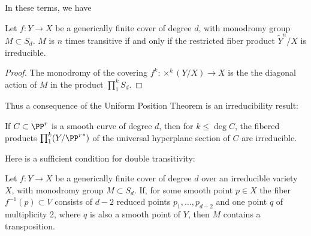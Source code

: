 
In these terms, we have 

\begin{lemma}\label{transitivity lemma}
Let $f : Y \to X$ be a generically finite cover of degree $d$, with  monodromy group $M \subset S_d$.
$M$ is $n$ times transitive if and only if the restricted fiber product $\tilde Y^n/X$ is irreducible.
\end{lemma}

\begin{proof}
The monodromy of the covering $f^k: \times^k(Y/X) \to X$ is the the diagonal action of
$M$ in the product $\prod_1^k S_d$.
\end{proof}

Thus a consequence of the Uniform Position Theorem is an irreducibility result:

\begin{corollary} If $C\subset \PP^r$ is a smooth curve of degree $d$, then 
for $k\leq \deg C$, the fibered products $\prod_1^k(Y/{\PP^r}^*)$  of the universal hyperplane section 
of $C$ are irreducible.
\end{corollary}

Here is a sufficient condition for double transitivity:

\begin{lemma}\label{transposition lemma}
Let $f : Y \to X$ be a generically finite cover of degree $d$ over an irreducible variety $X$, with  monodromy group $M \subset S_d$.  
If,  for some smooth point $p \in X$ the fiber $f^{-1}(p)\subset V$ consists of $d-2$ reduced points $p_1,\dots, p_{d-2}$ and one point $q$ of multiplicity 2, where $q$ is also a smooth point of $Y$, then $M$ contains a transposition.
\end{lemma}


